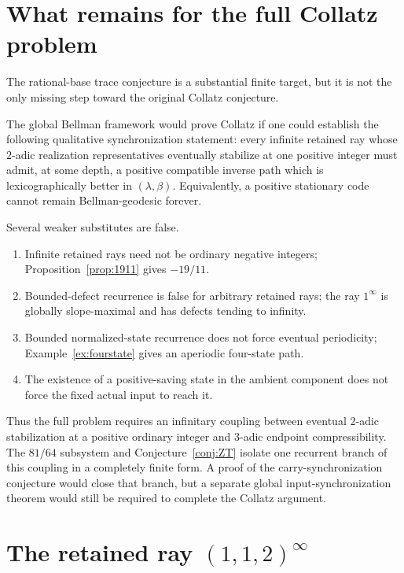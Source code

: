 \documentclass[11pt,reqno]{amsart}
\numberwithin{equation}{section}
\theoremstyle{definition}
\theoremstyle{remark}
\begin{document}
\section{What remains for the full Collatz problem}\label{sec:fullcollatz}

The rational-base trace conjecture is a substantial finite target, but it is not the only missing step toward the original Collatz conjecture.

The global Bellman framework would prove Collatz if one could establish the following qualitative synchronization statement: every infinite retained ray whose $2$-adic realization representatives eventually stabilize at one positive integer must admit, at some depth, a positive compatible inverse path which is lexicographically better in $(\lambda,\beta)$.  Equivalently, a positive stationary code cannot remain Bellman-geodesic forever.

Several weaker substitutes are false.

\begin{enumerate}[label=\textup{(\roman*)},leftmargin=2.3em]
\item Infinite retained rays need not be ordinary negative integers; Proposition~\ref{prop:1911} gives $-19/11$.
\item Bounded-defect recurrence is false for arbitrary retained rays; the ray $1^\infty$ is globally slope-maximal and has defects tending to infinity.
\item Bounded normalized-state recurrence does not force eventual periodicity; Example~\ref{ex:fourstate} gives an aperiodic four-state path.
\item The existence of a positive-saving state in the ambient component does not force the fixed actual input to reach it.
\end{enumerate}

Thus the full problem requires an infinitary coupling between eventual $2$-adic stabilization at a positive ordinary integer and $3$-adic endpoint compressibility.  The $81/64$ subsystem and Conjecture~\ref{conj:ZT} isolate one recurrent branch of this coupling in a completely finite form.  A proof of the carry-synchronization conjecture would close that branch, but a separate global input-synchronization theorem would still be required to complete the Collatz argument.

\appendix

\section{The retained ray $(1,1,2)^\infty$}\label{app:1911}
\end{document}
